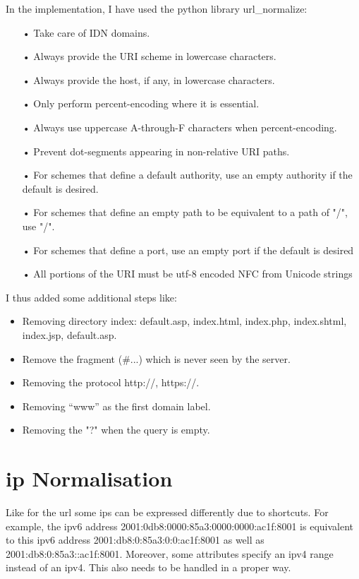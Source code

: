 \documentclass{eplmastersthesis}
\begin{document}
In the implementation, I have used the python library url\_normalize:
\begin{itemize}
\item[•] Take care of IDN domains.
\item[•] Always provide the URI scheme in lowercase characters.
\item[•] Always provide the host, if any, in lowercase characters.
\item[•] Only perform percent-encoding where it is essential.
\item[•] Always use uppercase A-through-F characters when percent-encoding.
\item[•] Prevent dot-segments appearing in non-relative URI paths.
\item[•] For schemes that define a default authority, use an empty authority if the default is desired.
\item[•] For schemes that define an empty path to be equivalent to a path of "/", use "/".
\item[•] For schemes that define a port, use an empty port if the default is desired
\item[•] All portions of the URI must be utf-8 encoded NFC from Unicode strings
\end{itemize}

I thus added some additional steps like:
\begin{itemize}
\item Removing directory index: {default.asp, index.html, index.php, index.shtml, index.jsp, default.asp}.
\item Remove the fragment (\#...) which is never seen by the server.
\item Removing the protocol {http://, https://}.
\item Removing  “www” as the first domain label.
\item Removing the "?" when the query is empty.
\end{itemize}

\section{\gls{ip} Normalisation}
\label{sec:IPNorm}
Like for the \gls{url} some \glspl{ip} can be expressed differently due to shortcuts. For example, the \gls{ipv6} address 2001:0db8:0000:85a3:0000:0000:ac1f:8001 is equivalent to this \gls{ipv6} address 2001:db8:0:85a3:0:0:ac1f:8001 as well as 2001:db8:0:85a3::ac1f:8001.
Moreover, some attributes specify an \gls{ipv4} range instead of an \gls{ipv4}. This also needs to be handled in a proper way.\\
\end{document}
